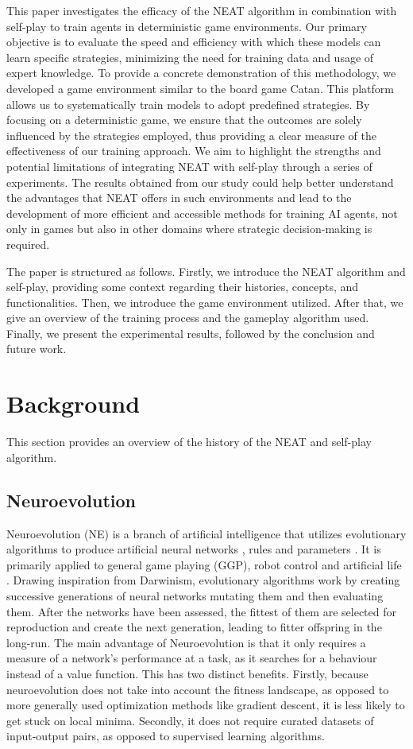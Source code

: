 \documentclass[letterpaper, 12pt]{article}
\begin{document}
This paper investigates the efficacy of the NEAT algorithm in combination with self-play
to train agents in deterministic game environments. Our primary objective is to evaluate
the speed and efficiency with which these models can learn specific strategies,
minimizing the need for training data and usage of expert knowledge. To provide a
concrete demonstration of this methodology, we developed a game environment similar to
the board game Catan. This platform allows us to systematically train models to adopt
predefined strategies. By focusing on a deterministic game, we ensure that the outcomes
are solely influenced by the strategies employed, thus providing a clear measure of the
effectiveness of our training approach. We aim to highlight the strengths and potential
limitations of integrating NEAT with self-play through a series of experiments. The
results obtained from our study could help better understand the advantages that NEAT
offers in such environments and lead to the development of more efficient and accessible
methods for training AI agents, not only in games but also in other domains where
strategic decision-making is required.

The paper is structured as follows. Firstly, we introduce the NEAT algorithm and
self-play, providing some context regarding their histories, concepts, and
functionalities. Then, we introduce the game environment utilized. After that, we give
an overview of the training process and the gameplay algorithm used. Finally, we present
the experimental results, followed by the conclusion and future work.

\section{Background}
This section provides an overview of the history of the NEAT and self-play algorithm.

\subsection{Neuroevolution}
Neuroevolution (NE) is a branch of artificial intelligence that utilizes evolutionary
algorithms to produce artificial neural networks \cite{bartz2014, flor2008}, rules and
parameters \cite{neuro19,evo2005,edgar2020}. It is primarily applied to general game
playing (GGP), robot control \cite{sekaj2019} and artificial life \cite{neurogames}.
Drawing inspiration from Darwinism, evolutionary algorithms work by creating successive
generations of neural networks mutating them and then evaluating them. After the
networks have been assessed, the fittest of them are selected for reproduction and
create the next generation, leading to fitter offspring in the long-run. The main
advantage of Neuroevolution is that it only requires a measure of a network's
performance at a task, as it searches for a behaviour instead of a value function. This
has two distinct benefits. Firstly, because neuroevolution does not take into account
the fitness landscape, as opposed to more generally used optimization methods like
gradient descent, it is less likely to get stuck on local minima. Secondly, it does not
require curated datasets of input-output pairs, as opposed to supervised learning
algorithms.
\end{document}
